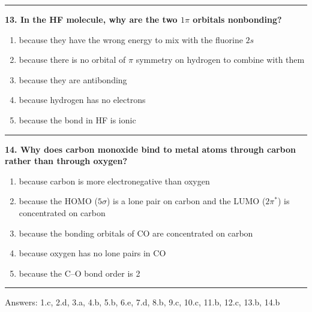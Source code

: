 \documentclass[
  english,
  9pt,
]{extbook}
\providecommand{\tightlist}{%
  \setlength{\itemsep}{0pt}\setlength{\parskip}{0pt}}
\theoremstyle{definition}
\theoremstyle{definition}
\theoremstyle{definition}
\theoremstyle{definition}
\theoremstyle{remark}
\begin{document}
\begin{center}\rule{0.5\linewidth}{0.5pt}\end{center}

\textbf{13. In the HF molecule, why are the two \(1\pi\) orbitals nonbonding?}

\begin{enumerate}
\def\labelenumi{\alph{enumi}.}
\tightlist
\item
  because they have the wrong energy to mix with the fluorine \(2s\)\\
\item
  because there is no orbital of \(\pi\) symmetry on hydrogen to combine with them\\
\item
  because they are antibonding\\
\item
  because hydrogen has no electrons\\
\item
  because the bond in HF is ionic
\end{enumerate}

\begin{center}\rule{0.5\linewidth}{0.5pt}\end{center}

\textbf{14. Why does carbon monoxide bind to metal atoms through carbon rather than through oxygen?}

\begin{enumerate}
\def\labelenumi{\alph{enumi}.}
\tightlist
\item
  because carbon is more electronegative than oxygen\\
\item
  because the HOMO (\(5\sigma\)) is a lone pair on carbon and the LUMO (\(2\pi^*\)) is concentrated on carbon\\
\item
  because the bonding orbitals of CO are concentrated on carbon\\
\item
  because oxygen has no lone pairs in CO\\
\item
  because the C--O bond order is 2
\end{enumerate}

\begin{center}\rule{0.5\linewidth}{0.5pt}\end{center}

Answers: 1.c, 2.d, 3.a, 4.b, 5.b, 6.e, 7.d, 8.b, 9.c, 10.c, 11.b, 12.c, 13.b, 14.b
\end{document}
